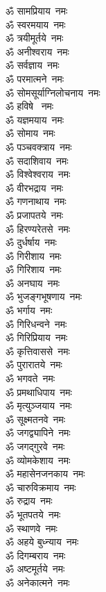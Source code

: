 \begin{multicols}{2}
\begin{flushleft}
ॐ सामप्रियाय~नमः\\
ॐ स्वरमयाय~नमः\\
ॐ त्रयीमूर्तये~नमः\\
ॐ अनीश्वराय~नमः\\
ॐ सर्वज्ञाय~नमः\\
ॐ परमात्मने~नमः\\
ॐ सोमसूर्याग्निलोचनाय~नमः\\
ॐ हविषे ~नमः\\
ॐ यज्ञमयाय~नमः\hfill{}\\
ॐ सोमाय~नमः\\
ॐ पञ्चवक्त्राय~नमः\\
ॐ सदाशिवाय~नमः\\
ॐ विश्वेश्वराय~नमः\\
ॐ वीरभद्राय~नमः\\
ॐ गणनाथाय~नमः\\
ॐ प्रजापतये~नमः\\
ॐ हिरण्यरेतसे~नमः\\
ॐ दुर्धर्षाय~नमः\\
ॐ गिरीशाय~नमः\hfill{}\\
ॐ गिरिशाय~नमः\\
ॐ अनघाय~नमः\\
ॐ भुजङ्गभूषणाय~नमः\\
ॐ भर्गाय~नमः\\
ॐ गिरिधन्वने~नमः\\
ॐ गिरिप्रियाय~नमः\\
ॐ कृत्तिवाससे~नमः\\
ॐ पुरारातये~नमः\\
ॐ भगवते~नमः\\
ॐ प्रमथाधिपाय~नमः\hfill{}\\
ॐ मृत्युञ्जयाय~नमः\\
ॐ सूक्ष्मतनवे~नमः\\
ॐ जगद्व्यापिने~नमः\\
ॐ जगद्गुरवे~नमः\\
ॐ व्योमकेशाय~नमः\\
ॐ महासेनजनकाय~नमः\\
ॐ चारुविक्रमाय~नमः\\
ॐ रुद्राय~नमः\\
ॐ भूतपतये~नमः\\
ॐ स्थाणवे~नमः\hfill{}\\
ॐ अहये बुध्न्याय~नमः\\
ॐ दिगम्बराय~नमः\\
ॐ अष्टमूर्तये~नमः\\
ॐ अनेकात्मने~नमः\\

\end{flushleft}
\end{multicols}
